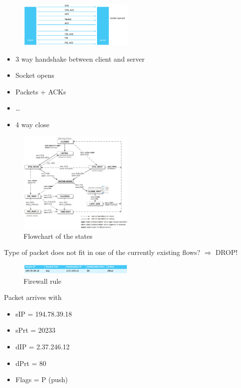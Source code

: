 \documentclass{article}
\begin{document}
\begin{figure}[H]
    \centering
    \includegraphics[width=0.5\textwidth]{stateful-packet-inspection.png}
    \caption{}
\end{figure}

\begin{itemize}
    \item 3 way handshake between client and server
    \item Socket opens
    \item Packets + ACKs
    \item \dots
    \item 4 way close
\end{itemize}

\begin{figure}[H]
    \centering
    \includegraphics[width=0.5\textwidth]{flowchart-states.png}
    \caption{Flowchart of the states}
\end{figure}


Type of packet does not fit in one of the currently existing flows? $\Rightarrow$ DROP!

\begin{figure}[H]
    \centering
    \includegraphics[width=0.5\textwidth]{spi-table.png}
    \caption{Firewall rule}
\end{figure}

Packet arrives with

\begin{itemize}
    \item sIP = 194.78.39.18
    \item sPrt = 20233
    \item dIP = 2.37.246.12
    \item dPrt = 80
    \item Flags = P (push)
\end{itemize}
\end{document}
